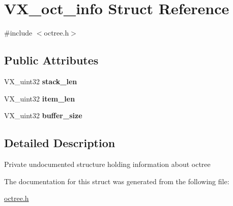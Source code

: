 \hypertarget{structVX__oct__info}{\section{V\-X\-\_\-oct\-\_\-info Struct Reference}
\label{structVX__oct__info}
}


{\ttfamily \#include $<$octree.\-h$>$}

\subsection*{Public Attributes}
\begin{DoxyCompactItemize}
\item 
\hypertarget{structVX__oct__info_a50906b217896d67a565eb34d2d2865e4}{V\-X\-\_\-uint32 {\bfseries stack\-\_\-len}}\label{structVX__oct__info_a50906b217896d67a565eb34d2d2865e4}

\item 
\hypertarget{structVX__oct__info_af5849e4661dc8d4f84b845f5cb782eff}{V\-X\-\_\-uint32 {\bfseries item\-\_\-len}}\label{structVX__oct__info_af5849e4661dc8d4f84b845f5cb782eff}

\item 
\hypertarget{structVX__oct__info_acd1721979753eb602533d98066dabd2a}{V\-X\-\_\-uint32 {\bfseries buffer\-\_\-size}}\label{structVX__oct__info_acd1721979753eb602533d98066dabd2a}

\end{DoxyCompactItemize}


\subsection{Detailed Description}
Private undocumented structure holding information about octree 

The documentation for this struct was generated from the following file\-:\begin{DoxyCompactItemize}
\item 
\hyperlink{octree_8h}{octree.\-h}\end{DoxyCompactItemize}
